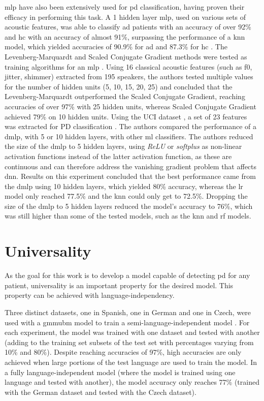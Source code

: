 \gls{mlp} have also been extensively used for \gls{pd} classification, having proven their efficacy in performing this task. A 1 hidden layer \gls{mlp}, used on various sets of acoustic features, was able to classify \gls{ad} patients with an accuracy of over 92\% and \gls{hc} with an accuracy of almost 91\%, surpassing the performance of a \gls{knn} model, which yielded accuracies of 90.9\% for \gls{ad} and 87.3\% for \gls{hc} \cite{alzheimer_2014_1}. The Levenberg-Marquardt and Scaled Conjugate Gradient methods were tested as training algorithms for an \gls{mlp} \cite{parkinson_mlp}. Using 16 classical acoustic features (such as \gls{f0}, jitter, shimmer) extracted from 195 speakers, the authors tested multiple values for the number of hidden units (5, 10, 15, 20, 25) and concluded that the Levenberg-Marquardt outperformed the Scaled Conjugate Gradient, reaching accuracies of over 97\% with 25 hidden units, whereas Scaled Conjugate Gradient achieved 79\% on 10 hidden units. Using the UCI dataset \cite{UCI}, a set of 23 features was extracted for PD classification \cite{deep_mlp_parkinson}. The authors compared the performance of a \gls{dmlp}, with 5 or 10 hidden layers, with other \gls{ml} classifiers. The authors reduced the size of the \gls{dmlp} to 5 hidden layers, using \textit{ReLU} or \textit{softplus} as non-linear activation functions instead of the latter activation function, as these are continuous and can therefore address the vanishing gradient problem that affects \gls{dnn}. Results on this experiment concluded that the best performance came from the \gls{dmlp} using 10 hidden layers, which yielded 80\% accuracy, whereas the \gls{lr} model only reached 77.5\% and the \gls{knn} could only get to 72.5\%. Dropping the size of the \gls{dmlp} to 5 hidden layers reduced the model's accuracy to 76\%, which was still higher than some of the tested models, such as the \gls{knn} and \gls{rf} models.

\section{Universality}

As the goal for this work is to develop a model capable of detecting \gls{pd} for any patient, universality is an important property for the desired model. This property can be achieved with language-independency. 

Three distinct datasets, one in Spanish, one in German and one in Czech, were used with a \gls{gmmubm} model to train a semi-language-independent model \cite{parkinson_three_languages}. For each experiment, the model was trained with one dataset and tested with another (adding to the training set subsets of the test set with percentages varying from 10\% and 80\%). Despite reaching accuracies of 97\%, high accuracies are only achieved when large portions of the test language are used to train the model. In a fully language-independent model (where the model is trained using one language and tested with another), the model accuracy only reaches 77\% (trained with the German dataset and tested with the Czech dataset).

